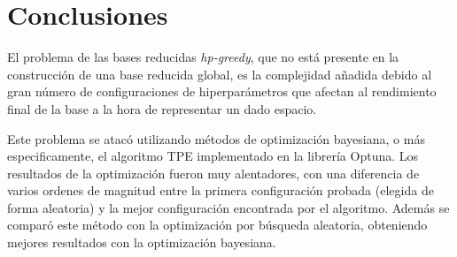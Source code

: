 \chapter{Conclusiones}













El problema de las bases reducidas \textit{hp-greedy}, que no está presente en la construcción de una base reducida global, es la complejidad añadida debido al gran número de configuraciones de hiperparámetros que afectan al rendimiento final de la base a la hora de representar un dado espacio. 

Este problema se atacó utilizando métodos de optimización bayesiana, o más especificamente, el algoritmo TPE implementado en la librería Optuna. Los resultados de la optimización fueron muy alentadores, con una diferencia de varios ordenes de magnitud entre la primera configuración probada (elegida de forma aleatoria) y la mejor configuración encontrada por el algoritmo. Además se comparó este método con la optimización por búsqueda aleatoria, obteniendo mejores resultados con la optimización bayesiana.


